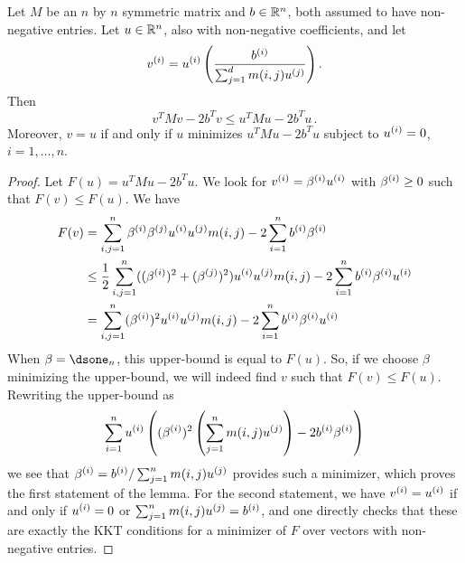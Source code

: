 \begin{lemma}
\label{lem:nmf}
Let $M$ be an $n$ by $n$ symmetric matrix and $b \in {\mathbb{R}}^n$, both assumed to have non-negative entries. 
Let $u\in {\mathbb{R}}^n$, also with non-negative coefficients, and let
\[
v^{(i)} = u^{(i)} \left(\frac{b^{(i)}}{\sum_{j=1}^d m(i,j) u^{(j)}}\right).
\]
Then
\[
v^TMv - 2b^Tv \leq u^TMu - 2b^Tu\,.
\]
Moreover, $v=u$ if and only if $u$ minimizes $u^TMu - 2b^Tu$ subject to $u^{(i)}=0$, $i=1, \ldots, n$.

\end{lemma}
\begin{proof}
Let $F(u) = u^TMu - 2b^Tu$.
We look for $v^{(i)} = \beta^{(i)} u^{(i)}$ with $\beta^{(i)} \geq 0$ such that $F(v) \leq F(u)$. We have
\begin{align*}
F(v) &= \sum_{i,j=1}^n \beta^{(i)} \beta^{(j)} u^{(i)}u^{(j)} m(i,j) - 2\sum_{i=1}^n b^{(i)} \beta^{(i)} \\
&\leq \frac12 \sum_{i,j=1}^n ((\beta^{(i)})^2 + (\beta^{(j)})^2) u^{(i)}u^{(j)} m(i,j) - 2\sum_{i=1}^n b^{(i)} \beta^{(i)} u^{(i)}\\
& =   \sum_{i,j=1}^n (\beta^{(i)})^2 u^{(i)} u^{(j)} m(i,j) - 2\sum_{i=1}^n b^{(i)} \beta^{(i)} u^{(i)}
\end{align*}
When $\beta = \dsone_n$, this upper-bound is equal to  $F(u)$. So, if we choose  $\beta$ minimizing the upper-bound, we will indeed find $v$ such that $F(v) \leq F(u)$. Rewriting the upper-bound as
\[
\sum_{i=1}^n u^{(i)}  \left((\beta^{(i)})^2 \left(\sum_{j=1}^n m(i,j) u^{(j)}\right) - 2 b^{(i)} \beta^{(i)}\right)
\]
we see that $\beta^{(i)} = b^{(i)} /  \sum_{j=1}^n m(i,j) u^{(j)}$ provides such a minimizer, which proves  the first statement of the lemma. For the second statement, we have $v^{(i)} = u^{(i)}$ if and only if $u^{(i)} = 0$ or  $\sum_{j=1}^n m(i,j) u^{(j)} = b^{(i)}$, and one directly checks that these are exactly the KKT conditions for a minimizer of $F$ over vectors with non-negative entries.
%
%
\end{proof}
 
